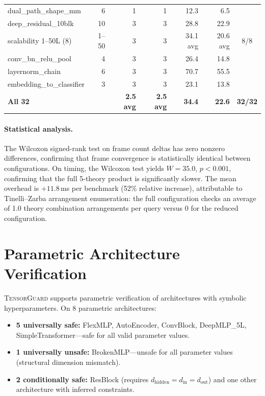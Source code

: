 \documentclass[11pt]{article}
\newcommand{\cmark}{\ding{51}}
\begin{document}
\begin{table}[h]
\begin{tabular}{@{}lrrrrrc@{}}
dual\_path\_shape\_mm       & 6  & 1 & 1 &  12.3 &  6.5 & \cmark \\
deep\_residual\_10blk       & 10 & 3 & 3 &  28.8 & 22.9 & \cmark \\
scalability 1--50L (8)      & 1--50 & 3 & 3 & 34.1 avg & 20.6 avg & 8/8 \\
conv\_bn\_relu\_pool        & 4  & 3 & 3 &  26.4 & 14.8 & \cmark \\
layernorm\_chain            & 6  & 3 & 3 &  70.7 & 55.5 & \cmark \\
embedding\_to\_classifier   & 3  & 3 & 3 &  23.1 & 13.8 & \cmark \\
\midrule
\textbf{All 32}             &    & \textbf{2.5 avg} & \textbf{2.5 avg} &
  \textbf{34.4} & \textbf{22.6} & \textbf{32/32} \\
\bottomrule
\end{tabular}
\end{table}

\paragraph{Statistical analysis.}
The Wilcoxon signed-rank test on frame count deltas has zero nonzero
differences, confirming that frame convergence is statistically
identical between configurations.  On timing, the Wilcoxon test
yields $W = 35.0$, $p < 0.001$, confirming that the full 5-theory
product is significantly slower.  The mean overhead is
$+11.8$\,ms per benchmark (52\% relative increase), attributable
to Tinelli--Zarba arrangement enumeration: the full configuration
checks an average of 1.0 theory combination arrangements per query
versus 0 for the reduced configuration.


\section{Parametric Architecture Verification}\label{app:parametric}

\textsc{TensorGuard} supports parametric verification of architectures
with symbolic hyperparameters.  On 8 parametric architectures:
\begin{itemize}[leftmargin=2em]
  \item \textbf{5 universally safe:} FlexMLP, AutoEncoder, ConvBlock,
    DeepMLP\_5L, SimpleTransformer---safe for all valid parameter values.
  \item \textbf{1 universally unsafe:} BrokenMLP---unsafe for all
    parameter values (structural dimension mismatch).
  \item \textbf{2 conditionally safe:} ResBlock (requires
    $d_{\text{hidden}} = d_{\text{in}} = d_{\text{out}}$) and one
    other architecture with inferred constraints.
\end{itemize}
\end{document}
